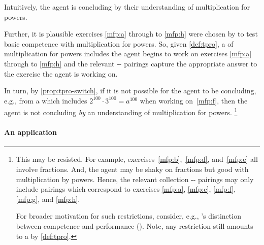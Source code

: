 \begin{note}
  \noindent%
  Intuitively, the agent is concluding by their understanding of multiplication for powers.

  Further, it is plausible exercises \ref{mfp:a} through to \ref{mfp:h} were chosen by \citeauthor{Gelfand:1993aa} to test basic competence with multiplication for powers.
  So, given \autoref{def:tpro}, a \tpro{} \tproS{} of multiplication for powers includes  the agent begins to work on exercises \ref{mfp:a} through to \ref{mfp:h} and the relevant -- pairings capture the appropriate answer to the exercise the agent is working on.

  In turn, by \autoref{prop:tpro-switch}, if it is not possible for the agent to be concluding, e.g.,  from a \pool{} which includes \(2^{100} \cdot 3^{100} = a^{100}\) when working on~\ref{mfp:f}, then the agent is not concluding \emph{by} an understanding of multiplication for powers.%
  \footnote{
    This may be resisted.
    For example, exercises~\ref{mfp:b},~\ref{mfp:d}, and~\ref{mfp:e} all involve fractions.
    And, the agent may be shaky on fractions but good with multiplication by powers.
    Hence, the relevant collection -- pairings may only include pairings which correspond to exercises \ref{mfp:a}, \ref{mfp:c}, \ref{mfp:f}, \ref{mfp:g}, and \ref{mfp:h}.

    For broader motivation for such restrictions, consider, e.g., \citeauthor{Chomsky:2015aa}'s distinction between competence and performance    (\citeyear[xii]{Chomsky:2015aa}).
    Note, any restriction still amounts to a \tpro{} by \autoref{def:tpro}.
  }
\end{note}



\paragraph*{An application}


